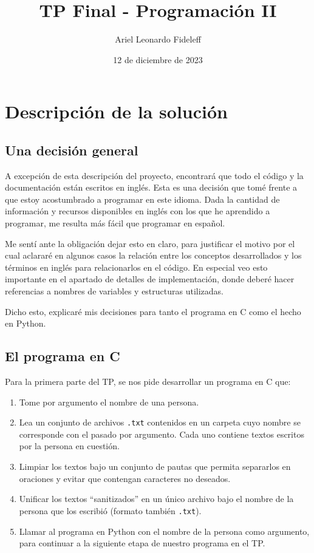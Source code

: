 \documentclass[a4paper]{article}
\title{TP Final - Programación II}
\author{Ariel Leonardo Fideleff}
\date{12 de diciembre de 2023}
\begin{document}
\maketitle

\tableofcontents
\pagebreak

\section{Descripción de la solución}

\subsection{Una decisión general}

A excepción de esta descripción del proyecto, encontrará que todo el código y la documentación están escritos en inglés. Esta es una decisión que tomé frente a que estoy acostumbrado a programar en este idioma. Dada la cantidad de información y recursos disponibles en inglés con los que he aprendido a programar, me resulta más fácil que programar en español.

Me sentí ante la obligación dejar esto en claro, para justificar el motivo por el cual aclararé en algunos casos la relación entre los conceptos desarrollados y los términos en inglés para relacionarlos en el código. En especial veo esto importante en el apartado de detalles de implementación, donde deberé hacer referencias a nombres de variables y estructuras utilizadas.

Dicho esto, explicaré mis decisiones para tanto el programa en C como el hecho en Python.

\subsection{El programa en C}

\noindent Para la primera parte del TP, se nos pide desarrollar un programa en C que:

\begin{enumerate}
    \item Tome por argumento el nombre de una persona.
    \item Lea un conjunto de archivos \texttt{.txt} contenidos en un carpeta cuyo nombre se corresponde con el pasado por argumento. Cada uno contiene textos escritos por la persona en cuestión.
    \item Limpiar los textos bajo un conjunto de pautas que permita separarlos en oraciones y evitar que contengan caracteres no deseados.
    \item Unificar los textos ``sanitizados'' en un único archivo bajo el nombre de la persona que los escribió (formato también \texttt{.txt}).
    \item Llamar al programa en Python con el nombre de la persona como argumento, para continuar a la siguiente etapa de nuestro programa en el TP.
\end{enumerate}
\end{document}
